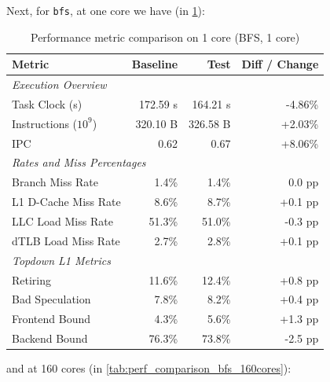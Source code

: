 Next, for \texttt{bfs}, at one core we have (in \cref{tab:perf_comparison_bfs_1core}):
\begin{table}[htbp]
  \centering
  \caption{Performance metric comparison on 1 core (BFS, 1 core)}
  \label{tab:perf_comparison_bfs_1core}
  \begin{tabular}{lrrr}
    \toprule
    \textbf{Metric} & \textbf{Baseline} & \textbf{Test} & \textbf{Diff / Change} \\
    \midrule
    \multicolumn{4}{l}{\textit{Execution Overview}} \\
    \quad Task Clock (s)           & 172.59 s   & 164.21 s   & -4.86\%   \\
    \quad Instructions ($10^9$)    & 320.10 B   & 326.58 B   & +2.03\%   \\
    \quad IPC                      & 0.62       & 0.67       & +8.06\%   \\
    \midrule
    \multicolumn{4}{l}{\textit{Rates and Miss Percentages}} \\
    \quad Branch Miss Rate         & 1.4\%      & 1.4\%      & 0.0 pp    \\
    \quad L1 D-Cache Miss Rate     & 8.6\%      & 8.7\%      & +0.1 pp   \\
    \quad LLC Load Miss Rate       & 51.3\%     & 51.0\%     & -0.3 pp   \\
    \quad dTLB Load Miss Rate      & 2.7\%      & 2.8\%      & +0.1 pp   \\
    \midrule
    \multicolumn{4}{l}{\textit{Topdown L1 Metrics}} \\
    \quad Retiring                 & 11.6\%     & 12.4\%     & +0.8 pp   \\
    \quad Bad Speculation          & 7.8\%     & 8.2\%     & +0.4 pp   \\
    \quad Frontend Bound           & 4.3\%     & 5.6\%     & +1.3 pp   \\
    \quad Backend Bound            & 76.3\%     & 73.8\%     & -2.5 pp   \\
    \bottomrule
  \end{tabular}
\end{table}
and at 160 cores (in \cref{tab:perf_comparison_bfs_160cores}):
